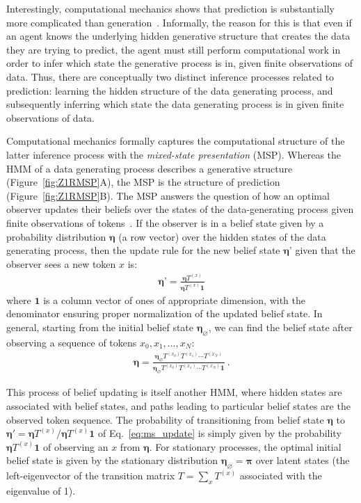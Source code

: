 \documentclass{article}
\newcommand{\ms}{\boldsymbol{\eta}}
\newcommand{\startms}{\ms_{\varnothing}}
\newcommand{\one}{\boldsymbol{1}}
\newcommand{\stationary}{\boldsymbol{\pi}}
\begin{document}
 Interestingly, computational mechanics shows that prediction is substantially more complicated than generation~\cite{lohr2012predictive, ruebeck2018prediction}. Informally, the reason for this is that even if an agent knows the underlying hidden generative structure that creates the data they are trying to predict, the agent must still perform computational work in order to infer which state the generative process is in, given finite observations of data. Thus, there are conceptually two distinct inference processes related to prediction: learning the hidden structure of the data generating process, and subsequently inferring which state the data generating process is in given finite observations of data.

Computational mechanics formally captures the computational structure of the latter inference process with the \textit{mixed-state presentation} (MSP). Whereas the HMM of a data generating process describes a generative structure (Figure~\ref{fig:Z1RMSP}A), the MSP is the structure of prediction (Figure~\ref{fig:Z1RMSP}B). The MSP answers the question of how an optimal observer updates their beliefs over the states of the data-generating process given finite observations of tokens~\citep{Riec18_SSAC1, Jurg21_Shannon}. If the observer is in a belief state given by a probability distribution \( \ms \) (a row vector) over the hidden states of the data generating process, then the update rule for the new belief state \( \ms’ \) given that the observer sees a new token $x$ is:
\begin{align}
\ms’ = \frac{\ms T^{(x)}}{\ms T^{(x)} \one}
\label{eq:ms_update}
\end{align}
where $\one$ is a column vector of ones of appropriate dimension, with the denominator ensuring proper normalization of the updated belief state. In general, starting from the initial belief state $\startms$, we can find the belief state after observing a sequence of tokens $x_0, x_1, \dots , x_N$:
\begin{align}
\ms = \frac{\startms T^{(x_0)} T^{(x_1)} \cdots T^{(x_N)}}{\startms T^{(x_0)} T^{(x_1)} \cdots T^{(x_N)} \one} ~.
\end{align}

This process of belief updating is itself another HMM, where hidden states are associated with belief states, and paths leading to particular belief states are the observed token sequence. The probability of transitioning from belief state $\ms$ to $\ms' = \ms T^{(x)} / \ms T^{(x)} \one$ of Eq.~\eqref{eq:ms_update} is simply given by the probability $\ms T^{(x)} \one$ of observing an $x$ from $\ms$. For stationary processes, the optimal initial belief state is given by the stationary distribution $\startms = \stationary$ over latent states (the left-eigenvector of the transition matrix $T=\sum_x T^{(x)}$ associated with the eigenvalue of 1).
\end{document}

